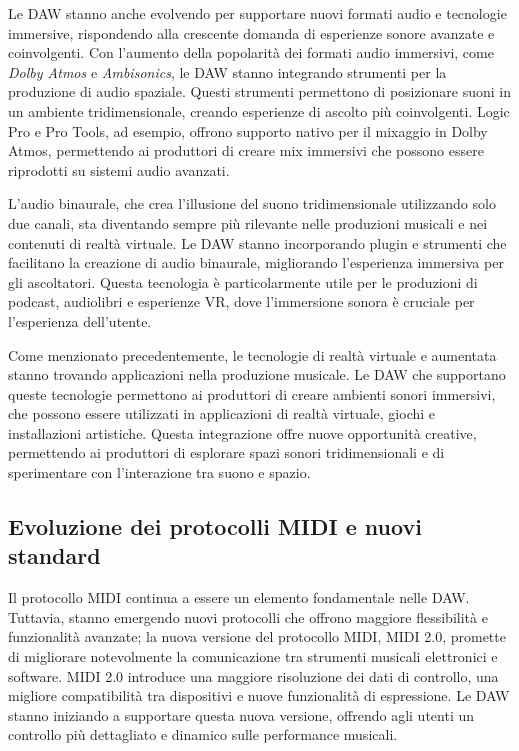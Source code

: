 \documentclass{book}
\begin{document}
Le DAW stanno anche evolvendo per supportare nuovi formati audio e tecnologie immersive, rispondendo alla crescente domanda di esperienze sonore avanzate e coinvolgenti. Con l’aumento della popolarità dei formati audio immersivi, come \textit{Dolby Atmos} e \textit{Ambisonics}, le DAW stanno integrando strumenti per la produzione di audio spaziale. Questi strumenti permettono di posizionare suoni in un ambiente tridimensionale, creando esperienze di ascolto più coinvolgenti. Logic Pro e Pro Tools, ad esempio, offrono supporto nativo per il mixaggio in Dolby Atmos, permettendo ai produttori di creare mix immersivi che possono essere riprodotti su sistemi audio avanzati.

L’audio binaurale, che crea l’illusione del suono tridimensionale utilizzando solo due canali, sta diventando sempre più rilevante nelle produzioni musicali e nei contenuti di realtà virtuale. Le DAW stanno incorporando plugin e strumenti che facilitano la creazione di audio binaurale, migliorando l’esperienza immersiva per gli ascoltatori. Questa tecnologia è particolarmente utile per le produzioni di podcast, audiolibri e esperienze VR, dove l’immersione sonora è cruciale per l’esperienza dell’utente.

Come menzionato precedentemente, le tecnologie di realtà virtuale e aumentata stanno trovando applicazioni nella produzione musicale. Le DAW che supportano queste tecnologie permettono ai produttori di creare ambienti sonori immersivi, che possono essere utilizzati in applicazioni di realtà virtuale, giochi e installazioni artistiche. Questa integrazione offre nuove opportunità creative, permettendo ai produttori di esplorare spazi sonori tridimensionali e di sperimentare con l’interazione tra suono e spazio.

\subsection{Evoluzione dei protocolli MIDI e nuovi standard}

Il protocollo MIDI continua a essere un elemento fondamentale nelle DAW. Tuttavia, stanno emergendo nuovi protocolli che offrono maggiore flessibilità e funzionalità avanzate; la nuova versione del protocollo MIDI, MIDI 2.0, promette di migliorare notevolmente la comunicazione tra strumenti musicali elettronici e software. MIDI 2.0 introduce una maggiore risoluzione dei dati di controllo, una migliore compatibilità tra dispositivi e nuove funzionalità di espressione. Le DAW stanno iniziando a supportare questa nuova versione, offrendo agli utenti un controllo più dettagliato e dinamico sulle performance musicali.
\end{document}
